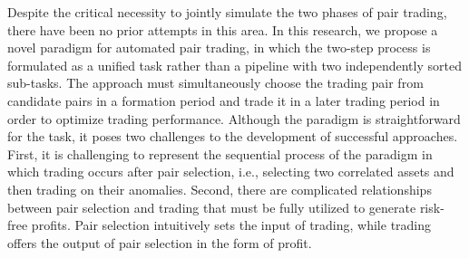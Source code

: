 \documentclass[sigconf]{acmart}
\begin{document}
Despite the critical necessity to jointly simulate the two phases of pair trading, there have been no prior attempts in this area. In this research, we propose a novel paradigm for automated pair trading, in which the two-step process is formulated as a unified task rather than a pipeline with two independently sorted sub-tasks. The approach must simultaneously choose the trading pair from candidate pairs in a formation period and trade it in a later trading period in order to optimize trading performance.
Although the paradigm is straightforward for the task, it poses two challenges to the development of successful approaches.
First, it is challenging to represent the sequential process of the paradigm in which trading occurs after pair selection, i.e., selecting two correlated assets and then trading on their anomalies. 
Second, there are complicated relationships between pair selection and trading that must be fully utilized to generate risk-free profits. 
Pair selection intuitively sets the input of trading, while trading offers the output of pair selection in the form of profit.
\end{document}
